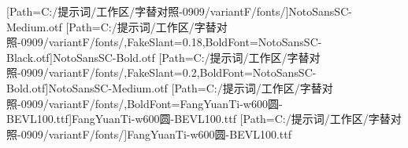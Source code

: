 \newfontfamily{\numpnum}[Path=C:/提示词/工作区/字替对照-0909/variantF/fonts/]{NotoSansSC-Medium.otf}
[Path=C:/提示词/工作区/字替对照-0909/variantF/fonts/,FakeSlant=0.18,BoldFont=NotoSansSC-Black.otf]{NotoSansSC-Bold.otf}
[Path=C:/提示词/工作区/字替对照-0909/variantF/fonts/,FakeSlant=0.2,BoldFont=NotoSansSC-Bold.otf]{NotoSansSC-Medium.otf}
[Path=C:/提示词/工作区/字替对照-0909/variantF/fonts/,BoldFont=FangYuanTi-w600圆-BEVL100.ttf]{FangYuanTi-w600圆-BEVL100.ttf}
\newfontfamily{\lilat}[Path=C:/提示词/工作区/字替对照-0909/variantF/fonts/]{FangYuanTi-w600圆-BEVL100.ttf}
\newcommand{\heiti}{\CJKfamily{hei}}
\newcommand{\heizhang}{\CJKfamily{heizhang}}
\newcommand{\heijie}{\CJKfamily{heijie}}
\newcommand{\hejie}{\CJKfamily{hejie}}
\newcommand{\hekeshi}{\CJKfamily{hekeshi}}
\newcommand{\libian}{\CJKfamily{libian}}
\newcommand{\libianb}{\CJKfamily{libianb}}
\newcommand{\libians}{\CJKfamily{libians}}
\newcommand{\heitiao}{\CJKfamily{heitiao}}
\newcommand{\heibf}{\CJKfamily{heibf}}
\newcommand{\heihao}{\CJKfamily{heihao}}
\newcommand{\heibian}{\CJKfamily{heibian}}
\newcommand{\huabf}{\CJKfamily{huabf}}
\newcommand{\lihei}{\CJKfamily{lihei}}
\newcommand{\kaishu}{\CJKfamily{kai}}
\newcommand{\fangsong}{\CJKfamily{fangsong}}%
